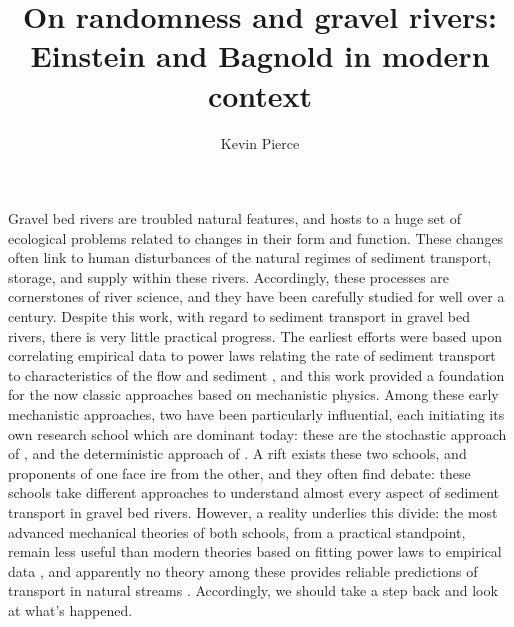 \documentclass{article}
\begin{document}
\title{On randomness and gravel rivers: Einstein and Bagnold in modern context}
\author{Kevin Pierce}
\maketitle


Gravel bed rivers are troubled natural features, and hosts to a huge set of ecological problems related to changes in their form and function.
These changes often link to human disturbances of the natural regimes of sediment transport, storage, and supply within these rivers. 
Accordingly, these processes are cornerstones of river science, and they have been carefully studied for well over a century. 
Despite this work, with regard to sediment transport in gravel bed rivers, there is very little practical progress. 
The earliest efforts were based upon correlating empirical data to power laws relating the rate of sediment transport to characteristics of the flow and sediment \citep{MeyerPeter1948}, and this work provided a foundation for the now classic approaches based on mechanistic physics. 
Among these early mechanistic approaches, two have been particularly influential, each initiating its own research school which are dominant today: these are the stochastic approach of \citet{Einstein1937, Einstein1950}, and the deterministic approach of \citet{Bagnold1956, Bagnold1973}.
A rift exists these two schools, and proponents of one face ire from the other, and they often find debate: these schools take different approaches to understand almost every aspect of sediment transport in gravel bed rivers. 
However, a reality underlies this divide: the most advanced mechanical theories of both schools, from a practical standpoint, remain less useful than modern theories based on fitting power laws to empirical data \citep{}, and apparently no theory among these provides reliable predictions of transport in natural streams \citep{}. 
Accordingly, we should take a step back and look at what's happened. 
\end{document}
